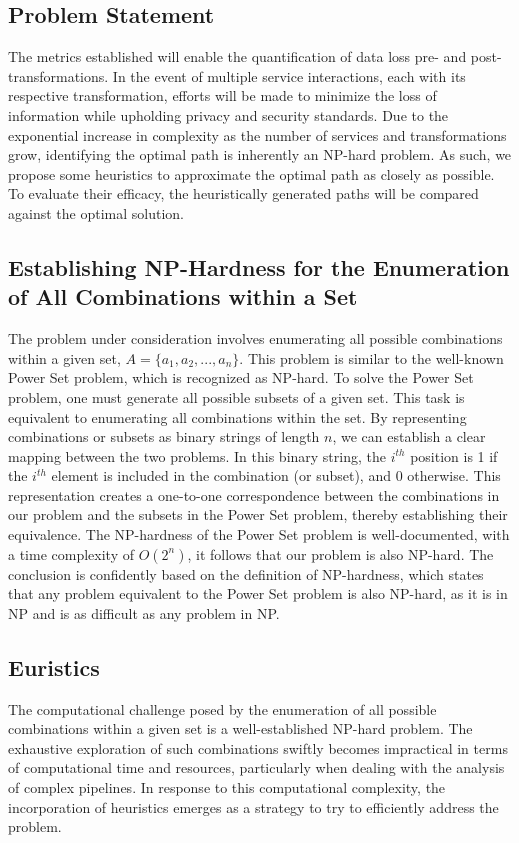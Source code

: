 \subsection{Problem Statement}
The metrics established will enable the quantification of data loss pre- and post-transformations.
In the event of multiple service interactions, each with its respective transformation, efforts will be made to minimize the loss of information while upholding privacy and security standards.
Due to the exponential increase in complexity as the number of services and transformations grow, identifying the optimal path is inherently an NP-hard problem.
As such, we propose some heuristics to approximate the optimal path as closely as possible.
To evaluate their efficacy, the heuristically generated paths will be compared against the optimal solution.
\subsection{Establishing NP-Hardness for the Enumeration of All Combinations within a Set}
The problem under consideration involves enumerating all possible combinations within a given set,
$A = \{a_1, a_2, ..., a_n\}$.
This problem is similar to the well-known Power Set problem, which is recognized as NP-hard.
To solve the Power Set problem, one must generate all possible subsets of a given set.
This task is equivalent to enumerating all combinations within the set.
By representing combinations or subsets as binary strings of length $n$,
we can establish a clear mapping between the two problems.
In this binary string, the $i^{th}$ position is 1 if the $i^{th}$ element is included in the combination (or subset), and 0 otherwise.
This representation creates a one-to-one correspondence between the combinations in our problem and the subsets in the Power Set problem,
thereby establishing their equivalence. The NP-hardness of the Power Set problem is well-documented, with a time complexity of $O(2^n)$,
it follows that our problem is also NP-hard.
The conclusion is confidently based on the definition of NP-hardness,
which states that any problem equivalent to the Power Set problem is also NP-hard,
as it is in NP and is as difficult as any problem in NP.

\subsection{Euristics}
The computational challenge posed by the enumeration of all possible combinations within a given set is a well-established NP-hard problem.
The exhaustive exploration of such combinations swiftly becomes impractical in terms of computational time and resources,
particularly when dealing with the analysis of complex pipelines.
In response to this computational complexity,
the incorporation of heuristics emerges as a strategy to try to efficiently address the problem.

